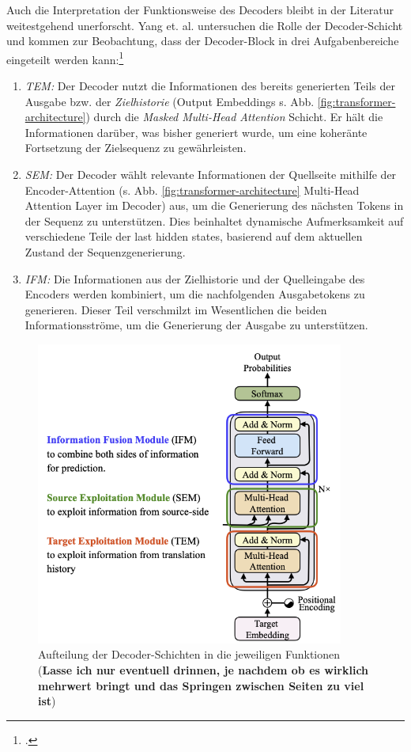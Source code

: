 Auch die Interpretation der Funktionsweise des Decoders bleibt in der Literatur weitestgehend unerforscht. Yang et. al. untersuchen die Rolle der Decoder-Schicht und kommen zur Beobachtung, dass der Decoder-Block in drei Aufgabenbereiche eingeteilt werden kann:\footcites[Vgl.][S. 2]{yang_sub-layer_2020}
\begin{enumerate}[1.]
    \item \emph{\ac{TEM}:} Der Decoder nutzt die Informationen des bereits generierten Teils der Ausgabe bzw. der \emph{Zielhistorie} (Output Embeddings s. Abb. \ref{fig:transformer-architecture}) durch die \emph{Masked Multi-Head Attention} Schicht. Er hält die Informationen darüber, was bisher generiert wurde, um eine koheränte Fortsetzung der Zielsequenz zu gewährleisten.
    \item \emph{\ac{SEM}:} Der Decoder wählt relevante Informationen der Quellseite mithilfe der Encoder-Attention (s. Abb. \ref{fig:transformer-architecture} Multi-Head Attention Layer im Decoder) aus, um die Generierung des nächsten Tokens in der Sequenz zu unterstützen. Dies beinhaltet dynamische Aufmerksamkeit auf verschiedene Teile der last hidden states, basierend auf dem aktuellen Zustand der Sequenzgenerierung.
    \item \emph{\ac{IFM}:} Die Informationen aus der Zielhistorie und der Quelleingabe des Encoders werden kombiniert, um die nachfolgenden Ausgabetokens zu generieren. Dieser Teil verschmilzt im Wesentlichen die beiden Informationsströme, um die Generierung der Ausgabe zu unterstützen.
\end{enumerate}
\begin{figure}
    \centering
    \includegraphics[height=100mm]{graphics/decoder layers explained.png}
    \caption[Aufteilung der Decoder-Schichten in die jeweiligen Funktionen]{Aufteilung der Decoder-Schichten in die jeweiligen Funktionen (\textbf{Lasse ich nur eventuell drinnen, je nachdem ob es wirklich mehrwert bringt und das Springen zwischen Seiten zu viel ist})\footnotemark}
    \label{fig:decoder-layers}
\end{figure}


